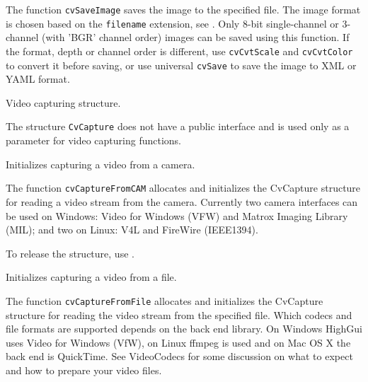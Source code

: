 The function \texttt{cvSaveImage} saves the image to the specified file. The image format is chosen based on the \texttt{filename} extension, see . Only 8-bit single-channel or 3-channel (with 'BGR' channel order) images can be saved using this function. If the format, depth or channel order is different, use \texttt{cvCvtScale} and \texttt{cvCvtColor} to convert it before saving, or use universal \texttt{cvSave} to save the image to XML or YAML format.


\label{CvCapture}
Video capturing structure.


The structure \texttt{CvCapture} does not have a public interface and is used only as a parameter for video capturing functions.

Initializes capturing a video from a camera.


\begin{description}
\end{description}

The function \texttt{cvCaptureFromCAM} allocates and initializes the CvCapture structure for reading a video stream from the camera. Currently two camera interfaces can be used on Windows: Video for Windows (VFW) and Matrox Imaging Library (MIL); and two on Linux: V4L and FireWire (IEEE1394).

To release the structure, use .


Initializes capturing a video from a file.


\begin{description}
\end{description}

The function \texttt{cvCaptureFromFile} allocates and initializes the CvCapture structure for reading the video stream from the specified file. Which codecs and file formats are supported depends on the back end library. On Windows HighGui uses Video for Windows (VfW), on Linux ffmpeg is used and on Mac OS X the back end is QuickTime. See VideoCodecs for some discussion on what to expect and how to prepare your video files.

